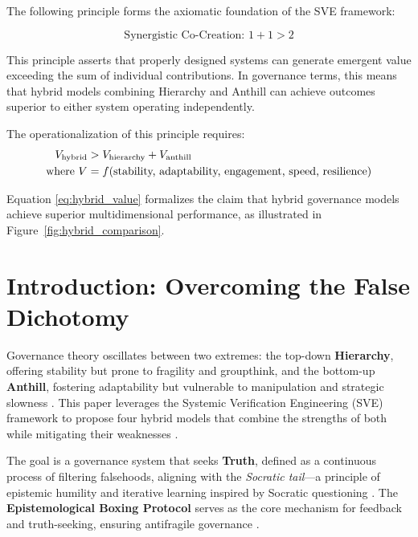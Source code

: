 \documentclass[11pt,a4paper]{article}
\begin{document}
\begin{small}
\noindent The following principle forms the axiomatic foundation of the SVE framework:

\begin{equation}
\text{Synergistic Co-Creation: } 1 + 1 > 2
\label{eq:synergy}
\end{equation}

\noindent This principle asserts that properly designed systems can generate emergent value exceeding the sum of individual contributions. In governance terms, this means that hybrid models combining Hierarchy and Anthill can achieve outcomes superior to either system operating independently.

The operationalization of this principle requires:
\begin{align}
V_{\text{hybrid}} &> V_{\text{hierarchy}} + V_{\text{anthill}} \label{eq:hybrid_value} \\
\text{where } V &= f(\text{stability, adaptability, engagement, speed, resilience}) \notag
\end{align}

\noindent Equation \eqref{eq:hybrid_value} formalizes the claim that hybrid governance models achieve superior multidimensional performance, as illustrated in Figure~\ref{fig:hybrid_comparison}.

\vspace{0.5cm}
\clearpage
\setcounter{page}{1}

\section{Introduction: Overcoming the False Dichotomy}
Governance theory oscillates between two extremes: the top-down \textbf{Hierarchy}, offering stability but prone to fragility and groupthink, and the bottom-up \textbf{Anthill}, fostering adaptability but vulnerable to manipulation and strategic slowness \citep[lines 2255--2263]{HybridModelsMemo}. This paper leverages the Systemic Verification Engineering (SVE) framework to propose four hybrid models that combine the strengths of both while mitigating their weaknesses \citep{Kovnatsky2025SVE1}. 

The goal is a governance system that seeks \textbf{Truth}, defined as a continuous process of filtering falsehoods, aligning with the \textit{Socratic tail}—a principle of epistemic humility and iterative learning inspired by Socratic questioning \citep{Kovnatsky2025Boxing}. The \textbf{Epistemological Boxing Protocol} serves as the core mechanism for feedback and truth-seeking, ensuring antifragile governance \citep{Taleb2012}.


\end{small}
\end{document}
